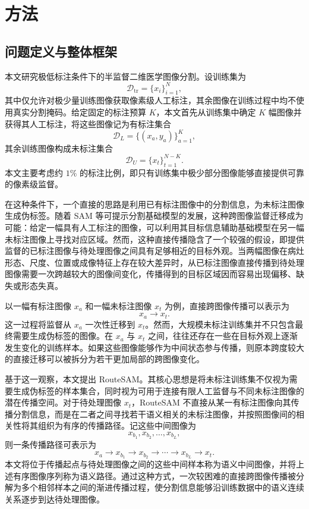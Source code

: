 \documentclass[UTF8,a4paper,10pt]{ctexart}
\begin{document}
\section{方法}
\label{sec:method-zh}


\subsection{问题定义与整体框架}

本文研究极低标注条件下的半监督二维医学图像分割。设训练集为
\[
\mathcal{D}_{\mathrm{tr}}=\{x_i\}_{i=1}^{N},
\]
其中仅允许对极少量训练图像获取像素级人工标注，其余图像在训练过程中均不使用真实分割掩码。给定固定的标注预算 \(K\)，本文首先从训练集中确定 \(K\) 幅图像并获得其人工标注，将这些图像记为有标注集合
\[
\mathcal{D}_{L}
=
\{(x_a,y_a)\}_{a=1}^{K},
\]
其余训练图像构成未标注集合
\[
\mathcal{D}_{U}
=
\{x_t\}_{t=1}^{N-K}.
\]
本文主要考虑约 \(1\%\) 的标注比例，即只有训练集中极少部分图像能够直接提供可靠的像素级监督。

在这种条件下，一个直接的思路是利用已有标注图像中的分割信息，为未标注图像生成伪标签。随着 SAM 等可提示分割基础模型的发展，这种跨图像监督迁移成为可能：给定一幅具有人工标注的图像，可以利用其目标信息辅助基础模型在另一幅未标注图像上寻找对应区域。然而，这种直接传播隐含了一个较强的假设，即提供监督的已标注图像与待处理图像之间具有足够相近的目标外观。当两幅图像在病灶形态、尺度、位置或成像特征上存在较大差异时，从已标注图像直接传播到待处理图像需要一次跨越较大的图像间变化，传播得到的目标区域因而容易出现偏移、缺失或形态失真。

以一幅有标注图像 \(x_a\) 和一幅未标注图像 \(x_t\) 为例，直接跨图像传播可以表示为
\[
x_a \rightarrow x_t.
\]
这一过程将监督从 \(x_a\) 一次性迁移到 \(x_t\)。然而，大规模未标注训练集并不只包含最终需要生成伪标签的图像。在 \(x_a\) 与 \(x_t\) 之间，往往还存在一些在目标外观上逐渐发生变化的训练样本。如果这些图像能够作为中间状态参与传播，则原本跨度较大的直接迁移可以被拆分为若干更加局部的跨图像变化。

基于这一观察，本文提出 RouteSAM。其核心思想是将未标注训练集不仅视为需要生成伪标签的样本集合，同时视为可用于连接有限人工监督与不同未标注图像的潜在传播空间。对于待处理图像 \(x_t\)，RouteSAM 不直接从某一有标注图像向其传播分割信息，而是在二者之间寻找若干语义相关的未标注图像，并按照图像间的相关性将其组织为有序的传播路径。记这些中间图像为
\[
x_{b_1},x_{b_2},\ldots,x_{b_L},
\]
则一条传播路径可表示为
\[
x_a
\rightarrow
x_{b_1}
\rightarrow
x_{b_2}
\rightarrow
\cdots
\rightarrow
x_{b_L}
\rightarrow
x_t.
\]
本文将位于传播起点与待处理图像之间的这些中间样本称为语义中间图像，并将上述有序图像序列称为语义路径。通过这种方式，一次较困难的直接跨图像传播被分解为多个相邻样本之间的渐进传播过程，使分割信息能够沿训练数据中的语义连续关系逐步到达待处理图像。
\end{document}
